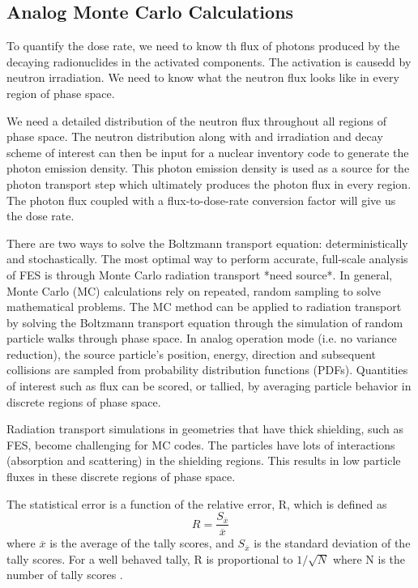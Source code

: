 
\subsection{Analog Monte Carlo Calculations}

To quantify the dose rate, we need to know th flux of photons
produced by the decaying radionuclides in the activated components. The
activation is causedd by neutron irradiation.
We need to know what the neutron flux looks like in every region of phase
space.

We need a detailed distribution of the neutron flux throughout all regions of phase
space.
The neutron distribution along with and irradiation and decay scheme of interest 
can then be input for a nuclear inventory code to generate the photon
emission density.  This photon emission density is used as a source for the
photon transport step which ultimately produces the photon flux in every region.
The photon flux coupled with a flux-to-dose-rate conversion factor will give us
the dose rate.


There are two ways to solve the Boltzmann transport equation: deterministically
and stochastically.
The most optimal way to perform accurate, full-scale analysis of FES is
through Monte Carlo radiation transport *need source*.
In general, Monte Carlo (MC) calculations rely on repeated, random sampling to solve
mathematical problems.  The MC method can be applied to radiation transport by
solving the Boltzmann transport equation through the simulation of random particle
walks through phase space.  In analog operation mode (i.e. no variance reduction), 
the source particle's position, energy, direction
and subsequent collisions are sampled from probability
distribution functions (PDFs).  Quantities of interest such as flux can be
scored, or tallied, by averaging particle behavior
in discrete regions of phase space.

Radiation transport simulations in geometries that have thick shielding, such as
FES, become challenging for MC codes.  The particles have lots of interactions
(absorption and scattering) in the shielding regions.  This results in low
particle fluxes in these discrete regions of phase space.  

The statistical error is a function of the relative error, R, which is defined as
\begin{equation} \label{eq:2}
		R = \frac{S_{\overline{x}}}{{\overline{x}}}
\end{equation}
where $\overline{x}$ is the average of the tally scores, and $S_{\overline{x}}$ is the standard
deviation of the tally scores.  For a well behaved tally, R is proportional
to $1/\sqrt{N}$ where N is the number of tally scores \cite{mcnp_manual}.

